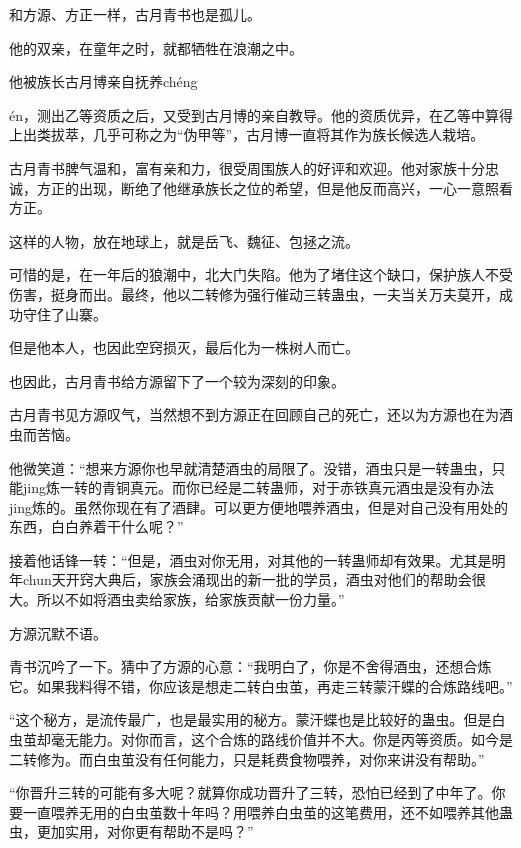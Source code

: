 
\begin{this_body}

和方源、方正一样，古月青书也是孤儿。

他的双亲，在童年之时，就都牺牲在浪潮之中。

他被族长古月博亲自抚养chéng

én，测出乙等资质之后，又受到古月博的亲自教导。他的资质优异，在乙等中算得上出类拔萃，几乎可称之为“伪甲等”，古月博一直将其作为族长候选人栽培。

古月青书脾气温和，富有亲和力，很受周围族人的好评和欢迎。他对家族十分忠诚，方正的出现，断绝了他继承族长之位的希望，但是他反而高兴，一心一意照看方正。

这样的人物，放在地球上，就是岳飞、魏征、包拯之流。

可惜的是，在一年后的狼潮中，北大门失陷。他为了堵住这个缺口，保护族人不受伤害，挺身而出。最终，他以二转修为强行催动三转蛊虫，一夫当关万夫莫开，成功守住了山寨。

但是他本人，也因此空窍损灭，最后化为一株树人而亡。

也因此，古月青书给方源留下了一个较为深刻的印象。

古月青书见方源叹气，当然想不到方源正在回顾自己的死亡，还以为方源也在为酒虫而苦恼。

他微笑道：“想来方源你也早就清楚酒虫的局限了。没错，酒虫只是一转蛊虫，只能jing炼一转的青铜真元。而你已经是二转蛊师，对于赤铁真元酒虫是没有办法jing炼的。虽然你现在有了酒肆。可以更方便地喂养酒虫，但是对自己没有用处的东西，白白养着干什么呢？”

接着他话锋一转：“但是，酒虫对你无用，对其他的一转蛊师却有效果。尤其是明年chun天开窍大典后，家族会涌现出的新一批的学员，酒虫对他们的帮助会很大。所以不如将酒虫卖给家族，给家族贡献一份力量。”

方源沉默不语。

青书沉吟了一下。猜中了方源的心意：“我明白了，你是不舍得酒虫，还想合炼它。如果我料得不错，你应该是想走二转白虫茧，再走三转蒙汗蝶的合炼路线吧。”

“这个秘方，是流传最广，也是最实用的秘方。蒙汗蝶也是比较好的蛊虫。但是白虫茧却毫无能力。对你而言，这个合炼的路线价值并不大。你是丙等资质。如今是二转修为。而白虫茧没有任何能力，只是耗费食物喂养，对你来讲没有帮助。”

“你晋升三转的可能有多大呢？就算你成功晋升了三转，恐怕已经到了中年了。你要一直喂养无用的白虫茧数十年吗？用喂养白虫茧的这笔费用，还不如喂养其他蛊虫，更加实用，对你更有帮助不是吗？”


\end{this_body}
